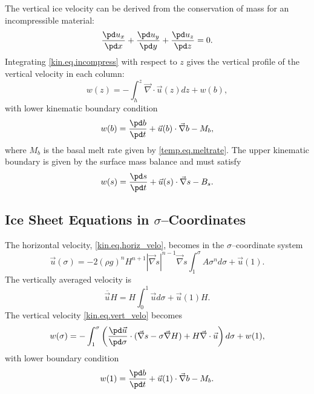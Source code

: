 The vertical ice velocity can be derived from the conservation of mass for an incompressible material:
\begin{equation}
  \label{kin.eq.incompress}
  \frac{\pd u_x}{\pd x} + \frac{\pd u_y}{\pd y} + \frac{\pd u_z}{\pd z} = 0.
\end{equation}
Integrating \eqref{kin.eq.incompress} with respect to $z$ gives the vertical profile of the vertical velocity in each column:
\begin{equation}
  \label{kin.eq.vert_velo}
  w(z)=-\int_h^z\vec\nabla\cdot\vec u(z)dz+w(b),
\end{equation}
with lower kinematic boundary condition
\begin{equation}
  w(b)=\frac{\pd b}{\pd t}+\vec u(b)\cdot\vec\nabla b - M_b,
\end{equation}
where $M_b$ is the basal melt rate given by \eqref{temp.eq.meltrate}. The upper kinematic boundary is given by the surface mass balance and must satisfy
\begin{equation}
  \label{kin.eq.upper_bc}
  w(s)=\frac{\pd s}{\pd t}+\vec u(s)\cdot\vec\nabla s - B_s.
\end{equation}



\subsection{Ice Sheet Equations in $\sigma$--Coordinates}
The horizontal velocity, \eqref{kin.eq.horiz_velo}, becomes in the $\sigma$--coordinate system
\begin{equation}
  \label{kin.eq.vert_velo_sigma}
  \vec u(\sigma) = -2(\rho g)^nH^{n+1}|\vec\nabla s|^{n-1}\vec\nabla s\int_1^\sigma A\sigma^nd\sigma+\vec u(1).
\end{equation}
The vertically averaged velocity is
\begin{equation}
  \label{kin.eq.avg_velo_scaled}
  \overline{\vec u} H=H\int_0^1\vec ud\sigma+\vec u(1)H.
\end{equation}
The vertical velocity \eqref{kin.eq.vert_velo} becomes
\begin{equation}
  \label{kin.eq.vert_velo_scaled}
  w(\sigma)=-\int_1^\sigma\left(\frac{\pd\vec u}{\pd\sigma}\cdot(\vec\nabla s-\sigma\vec\nabla H)+H\vec\nabla\cdot\vec u\right)d\sigma+w(1),
\end{equation}
with lower boundary condition
\begin{equation}
  w(1)=\frac{\pd b}{\pd t}+\vec u(1)\cdot\vec\nabla b - M_b.
\end{equation}

